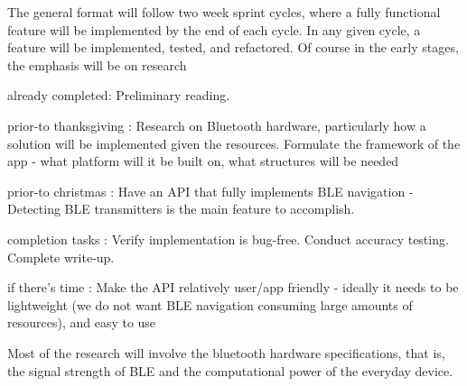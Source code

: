 \documentclass{sig-alternate}
\begin{document}
The general format will follow two week sprint cycles, where a fully 
functional feature will be implemented by the end of each cycle. In
any given cycle, a feature will be implemented, tested, and refactored. 
Of course in the early stages, the emphasis will be on research
\begin{itemize*}
	\item {\sc already completed}: Preliminary reading. \vspace{3pt}
	\item {\sc prior-to thanksgiving} : Research on Bluetooth hardware, particularly how a solution will be implemented given the resources. Formulate the framework of the app - what platform will it be built on, what structures will be needed\vspace{3pt}
	\item {\sc prior-to christmas} : Have an API that fully implements BLE navigation - Detecting BLE transmitters is the main feature to accomplish.\vspace{3pt}
	\item {\sc completion tasks} : Verify implementation is bug-free. Conduct accuracy testing. Complete write-up.\vspace{3pt}
	\item {\sc if there's time} : Make the API relatively user/app friendly - ideally it needs to be
lightweight (we do not want BLE navigation consuming large amounts of resources), and easy to use
\end{itemize*}
Most of the research will involve the bluetooth hardware specifications, 
that is, the signal strength of BLE and the computational power of the 
everyday device.

 
  
\end{document}
